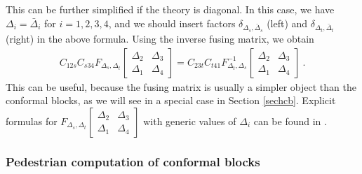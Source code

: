 \documentclass[12pt, a4paper, notitlepage, twoside]{report}
\numberwithin{equation}{section}
\theoremstyle{break}
\begin{document}
This can be further simplified if the theory is diagonal.
In this case, we have $\Delta_i=\bar{\Delta}_i$ for $i=1,2,3,4$, and we should insert factors $\delta_{\Delta_s,\bar\Delta_s}$ (left) and $\delta_{\Delta_t,\bar\Delta_t}$ (right) in the above formula.
Using the inverse fusing matrix, we obtain 
\begin{align}
 C_{12s} C_{s34}
F_{\Delta_s,\Delta_t}\begin{bmatrix} \Delta_2 & \Delta_3 \\ \Delta_1 & \Delta_4 \end{bmatrix}
= C_{23t}C_{t41} 
F^{-1}_{\Delta_t,\Delta_s}\begin{bmatrix} \Delta_2 & \Delta_3 \\ \Delta_1 & \Delta_4 \end{bmatrix}
\ .
\end{align}
This can be useful, because the fusing matrix is usually a simpler object than the conformal blocks, as we will see in a special case in Section \ref{sechcb}.
Explicit formulas for $F_{\Delta_s,\Delta_t}\begin{bmatrix} \Delta_2 & \Delta_3 \\ \Delta_1 & \Delta_4 \end{bmatrix}$ with generic values of $\Delta_i$ can be found in \cite{tv12}.


\subsubsection{Pedestrian computation of conformal blocks}
\end{document}
